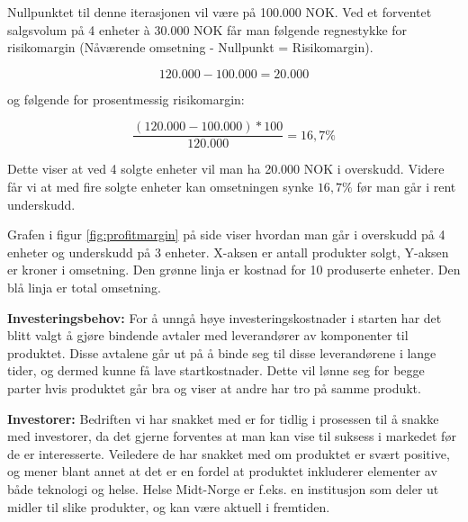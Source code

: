 Nullpunktet til denne iterasjonen vil være på 100.000 NOK. Ved et forventet salgsvolum på 4 enheter à 30.000 NOK får man følgende regnestykke for risikomargin (Nåværende omsetning - Nullpunkt = Risikomargin).

$$ 120.000 - 100.000 = 20.000$$

og følgende for prosentmessig risikomargin:

$$ \frac{(120.000 - 100.000) * 100}{120.000} = 16,7 \% $$

Dette viser at ved 4 solgte enheter vil man ha 20.000 NOK i overskudd. Videre får vi at med fire solgte enheter kan omsetningen synke $16,7 \%$ før man går i rent underskudd.

Grafen i figur \ref{fig:profitmargin} på side \pageref{fig:profitmargin} viser hvordan man går i overskudd på 4 enheter og underskudd på 3 enheter. X-aksen er antall produkter solgt, Y-aksen er kroner i omsetning. Den grønne linja er kostnad for 10 produserte enheter. Den blå linja er total omsetning.

\textbf{Investeringsbehov:}
For å unngå høye investeringskostnader i starten har det blitt valgt å gjøre bindende avtaler med leverandører av komponenter til produktet. Disse avtalene går ut på å binde seg til disse leverandørene i lange tider, og dermed kunne få lave startkostnader. Dette vil lønne seg for begge parter hvis produktet går bra og viser at andre har tro på samme produkt.

\textbf{Investorer:}
Bedriften vi har snakket med er for tidlig i prosessen til å snakke med investorer, da det gjerne forventes at man kan vise til suksess i markedet før de er interesserte.
Veiledere de har snakket med om produktet er svært positive, og mener blant annet at det er en fordel at produktet inkluderer elementer av både teknologi og helse. Helse Midt-Norge er f.eks. en institusjon som deler ut midler til slike produkter, og kan være aktuell i fremtiden.

